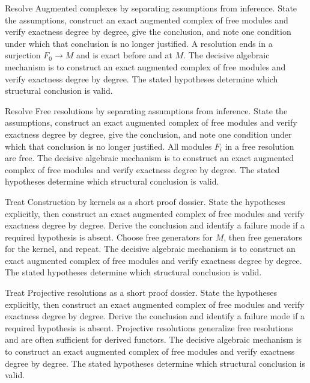 \begin{example}\label{ex:v23-worked-01}
Resolve Augmented complexes by separating assumptions from inference. State the assumptions, construct an exact augmented complex of free modules and verify exactness degree by degree, give the conclusion, and note one condition under which that conclusion is no longer justified. A resolution ends in a surjection $F_0\to M$ and is exact before and at $M$. The decisive algebraic mechanism is to construct an exact augmented complex of free modules and verify exactness degree by degree. The stated hypotheses determine which structural conclusion is valid.
\end{example}

\begin{example}\label{ex:v23-worked-02}
Resolve Free resolutions by separating assumptions from inference. State the assumptions, construct an exact augmented complex of free modules and verify exactness degree by degree, give the conclusion, and note one condition under which that conclusion is no longer justified. All modules $F_i$ in a free resolution are free. The decisive algebraic mechanism is to construct an exact augmented complex of free modules and verify exactness degree by degree. The stated hypotheses determine which structural conclusion is valid.
\end{example}

\begin{example}\label{ex:v23-worked-03}
Treat Construction by kernels as a short proof dossier. State the hypotheses explicitly, then construct an exact augmented complex of free modules and verify exactness degree by degree. Derive the conclusion and identify a failure mode if a required hypothesis is absent. Choose free generators for $M$, then free generators for the kernel, and repeat. The decisive algebraic mechanism is to construct an exact augmented complex of free modules and verify exactness degree by degree. The stated hypotheses determine which structural conclusion is valid.
\end{example}

\begin{example}\label{ex:v23-worked-04}
Treat Projective resolutions as a short proof dossier. State the hypotheses explicitly, then construct an exact augmented complex of free modules and verify exactness degree by degree. Derive the conclusion and identify a failure mode if a required hypothesis is absent. Projective resolutions generalize free resolutions and are often sufficient for derived functors. The decisive algebraic mechanism is to construct an exact augmented complex of free modules and verify exactness degree by degree. The stated hypotheses determine which structural conclusion is valid.
\end{example}

